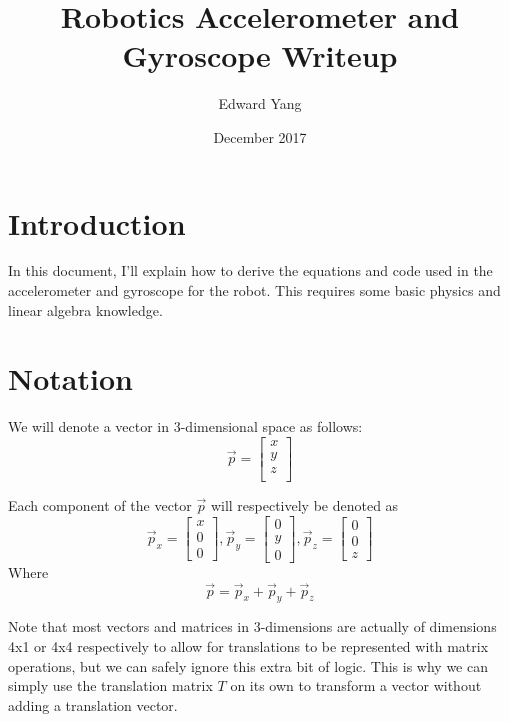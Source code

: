 \documentclass{article}
\title{Robotics Accelerometer and Gyroscope Writeup}
\author{Edward Yang}
\date{December 2017}
\begin{document}
\maketitle

\tableofcontents
\clearpage
\section{Introduction}
In this document, I'll explain how to derive the equations and code used in the accelerometer and gyroscope for the robot. This requires some basic physics and linear algebra knowledge.

\section{Notation}
We will denote a vector in 3-dimensional space as follows:
\[
    \vec{p}
    =
    \begin{bmatrix}
        x \\ y \\ z \\
    \end{bmatrix}
\]

Each component of the vector $\vec{p}$ will respectively be denoted as
\[
    \vec{p}_x = 
    \begin{bmatrix}
        x \\ 0 \\ 0
    \end{bmatrix}
    ,
    \vec{p}_y = 
    \begin{bmatrix}
        0 \\ y \\ 0
    \end{bmatrix}
    ,
    \vec{p}_z = 
    \begin{bmatrix}
        0 \\ 0 \\ z
    \end{bmatrix}
\]
Where
\[
    \vec{p} = \vec{p}_x + \vec{p}_y + \vec{p}_z
\]

Note that most vectors and matrices in 3-dimensions are actually of dimensions 4x1 or 4x4 respectively to allow for translations to be represented with matrix operations, but we can safely ignore this extra bit of logic. This is why we can simply use the translation matrix $T$ on its own to transform a vector without adding a translation vector.

\clearpage
\end{document}
